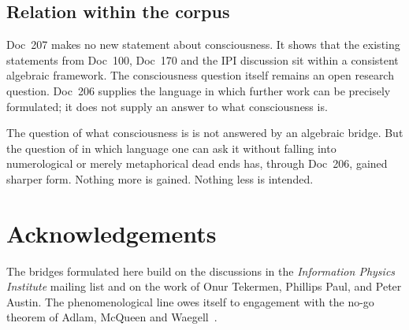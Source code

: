 \subsection{Relation within the corpus}

\begin{center}
\end{center}

Doc~207 makes no new statement about consciousness. It shows that the existing statements from Doc~100, Doc~170 and the IPI discussion sit within a consistent algebraic framework. The consciousness question itself remains an open research question. Doc~206 supplies the language in which further work can be precisely formulated; it does not supply an answer to what consciousness is.

\begin{philosophical}[Closing]
The question of what consciousness is is not answered by an algebraic bridge. But the question of in which language one can ask it without falling into numerological or merely metaphorical dead ends has, through Doc~206, gained sharper form. Nothing more is gained. Nothing less is intended.
\end{philosophical}

\section*{Acknowledgements}

The bridges formulated here build on the discussions in the \emph{Information Physics Institute} mailing list and on the work of Onur Tekermen, Phillips Paul, and Peter Austin. The phenomenological line owes itself to engagement with the no-go theorem of Adlam, McQueen and Waegell~\cite{Adlam2025}.

